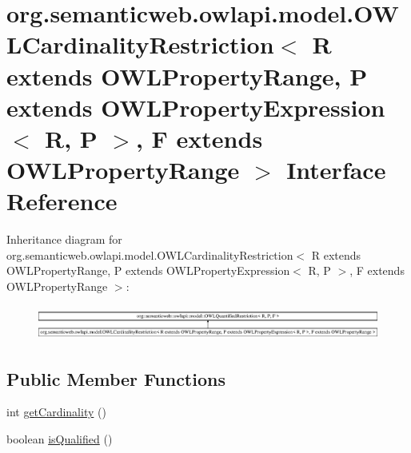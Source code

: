 \hypertarget{interfaceorg_1_1semanticweb_1_1owlapi_1_1model_1_1_o_w_l_cardinality_restriction_3_01_r_01extend3753e765e18fa3094a9c5d39619b7cfe}{\section{org.\-semanticweb.\-owlapi.\-model.\-O\-W\-L\-Cardinality\-Restriction$<$ R extends O\-W\-L\-Property\-Range, P extends O\-W\-L\-Property\-Expression$<$ R, P $>$, F extends O\-W\-L\-Property\-Range $>$ Interface Reference}
\label{interfaceorg_1_1semanticweb_1_1owlapi_1_1model_1_1_o_w_l_cardinality_restriction_3_01_r_01extend3753e765e18fa3094a9c5d39619b7cfe}
}
Inheritance diagram for org.\-semanticweb.\-owlapi.\-model.\-O\-W\-L\-Cardinality\-Restriction$<$ R extends O\-W\-L\-Property\-Range, P extends O\-W\-L\-Property\-Expression$<$ R, P $>$, F extends O\-W\-L\-Property\-Range $>$\-:\begin{figure}[H]
\begin{center}
\leavevmode
\includegraphics[height=1.139369cm]{interfaceorg_1_1semanticweb_1_1owlapi_1_1model_1_1_o_w_l_cardinality_restriction_3_01_r_01extend3753e765e18fa3094a9c5d39619b7cfe}
\end{center}
\end{figure}
\subsection*{Public Member Functions}
\begin{DoxyCompactItemize}
\item 
int \hyperlink{interfaceorg_1_1semanticweb_1_1owlapi_1_1model_1_1_o_w_l_cardinality_restriction_3_01_r_01extend3753e765e18fa3094a9c5d39619b7cfe_af5302259c9d899de01870bd4a209f470}{get\-Cardinality} ()
\item 
boolean \hyperlink{interfaceorg_1_1semanticweb_1_1owlapi_1_1model_1_1_o_w_l_cardinality_restriction_3_01_r_01extend3753e765e18fa3094a9c5d39619b7cfe_a958f6bfec67b6c667a033d558434bcf8}{is\-Qualified} ()
\end{DoxyCompactItemize}


